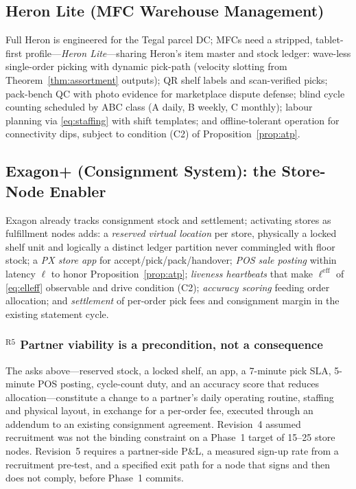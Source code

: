 \subsection{Heron Lite (MFC Warehouse Management)}
Full Heron is engineered for the Tegal parcel DC; MFCs need a stripped, tablet-first profile---\emph{Heron Lite}---sharing Heron's item master and stock ledger: wave-less single-order picking with dynamic pick-path (velocity slotting from Theorem~\ref{thm:assortment} outputs); QR shelf labels and scan-verified picks; pack-bench QC with photo evidence for marketplace dispute defense; blind cycle counting scheduled by ABC class (A daily, B weekly, C monthly); labour planning via \eqref{eq:staffing} with shift templates; and offline-tolerant operation for connectivity dips, subject to condition (C2) of Proposition~\ref{prop:atp}. 

\subsection{Exagon+ (Consignment System): the Store-Node Enabler}
Exagon already tracks consignment stock and settlement; activating stores as fulfillment nodes adds: a \emph{reserved virtual location} per store, physically a locked shelf unit and logically a distinct ledger partition never commingled with floor stock; a \emph{PX store app} for accept/pick/pack/handover; \emph{POS sale posting} within latency $\ell$ to honor Proposition~\ref{prop:atp}; \emph{liveness heartbeats} that make $\ell^{\mathrm{eff}}$ of \eqref{eq:elleff} observable and drive condition (C2); \emph{accuracy scoring} feeding order allocation; and \emph{settlement} of per-order pick fees and consignment margin in the existing statement cycle.

\subsubsection*{$^{\mathrm{R5}}$ Partner viability is a precondition, not a consequence}
The asks above---reserved stock, a locked shelf, an app, a 7-minute pick SLA, 5-minute POS posting, cycle-count duty, and an accuracy score that reduces allocation---constitute a change to a partner's daily operating routine, staffing and physical layout, in exchange for a per-order fee, executed through an addendum to an existing consignment agreement. Revision~4 assumed recruitment was not the binding constraint on a Phase~1 target of 15--25 store nodes. Revision~5 requires a partner-side P\&L, a measured sign-up rate from a recruitment pre-test, and a specified exit path for a node that signs and then does not comply, before Phase~1 commits. 


